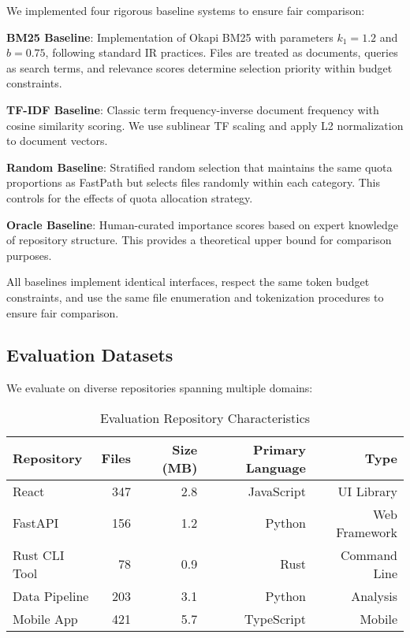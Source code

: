 \documentclass[conference]{IEEEtran}
\begin{document}
We implemented four rigorous baseline systems to ensure fair comparison:

\textbf{BM25 Baseline}: Implementation of Okapi BM25 with parameters $k_1 = 1.2$ and $b = 0.75$, following standard IR practices. Files are treated as documents, queries as search terms, and relevance scores determine selection priority within budget constraints.

\textbf{TF-IDF Baseline}: Classic term frequency-inverse document frequency with cosine similarity scoring. We use sublinear TF scaling and apply L2 normalization to document vectors.

\textbf{Random Baseline}: Stratified random selection that maintains the same quota proportions as FastPath but selects files randomly within each category. This controls for the effects of quota allocation strategy.

\textbf{Oracle Baseline}: Human-curated importance scores based on expert knowledge of repository structure. This provides a theoretical upper bound for comparison purposes.

All baselines implement identical interfaces, respect the same token budget constraints, and use the same file enumeration and tokenization procedures to ensure fair comparison.

\subsection{Evaluation Datasets}

We evaluate on diverse repositories spanning multiple domains:

\begin{table}[t]
\centering
\caption{Evaluation Repository Characteristics}
\label{tab:repositories}
\begin{tabular}{@{}lrrrr@{}}
\toprule
Repository & Files & Size (MB) & Primary Language & Type \\
\midrule
React & 347 & 2.8 & JavaScript & UI Library \\
FastAPI & 156 & 1.2 & Python & Web Framework \\
Rust CLI Tool & 78 & 0.9 & Rust & Command Line \\
Data Pipeline & 203 & 3.1 & Python & Analysis \\
Mobile App & 421 & 5.7 & TypeScript & Mobile \\
\bottomrule
\end{tabular}
\end{table}
\end{document}
